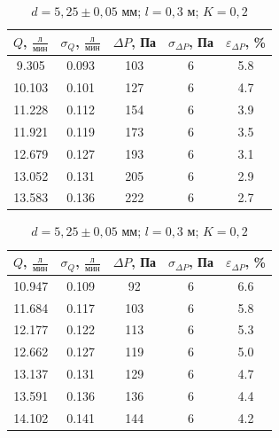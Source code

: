 \documentclass[a4paper,12pt]{article}
\begin{document}
\begin{table}[h!]
\centering
\begin{minipage}{0.48\textwidth}
\centering
    \begin{tabular}{|c|c|c|c|c|}
        \hline
        $Q$, $\frac{\text{л}}{\text{мин}}$ & $\sigma_Q$, $\frac{\text{л}}{\text{мин}}$  & $\Delta P$, Па & $\sigma_{\Delta P}$, Па & $\varepsilon_{\Delta P}$, \% \\
        \hline
        9.305 & 0.093 & 103 & 6 & 5.8 \\ \hline
        10.103 & 0.101 & 127 & 6 & 4.7 \\ \hline
        11.228 & 0.112 & 154 & 6 & 3.9 \\ \hline
        11.921 & 0.119 & 173 & 6 & 3.5 \\ \hline
        12.679 & 0.127 & 193 & 6 & 3.1 \\ \hline
        13.052 & 0.131 & 205 & 6 & 2.9 \\ \hline
        13.583 & 0.136 & 222 & 6 & 2.7 \\ \hline
    \end{tabular}
    \caption{$d=5,25 \pm 0,05$ мм; $l = 0,4$ м; $K = 0,2$}
\end{minipage}
\hfill
\begin{minipage}{0.48\textwidth}
\centering
    \begin{tabular}{|c|c|c|c|c|}
        \hline
        $Q$, $\frac{\text{л}}{\text{мин}}$ & $\sigma_Q$, $\frac{\text{л}}{\text{мин}}$  & $\Delta P$, Па & $\sigma_{\Delta P}$, Па & $\varepsilon_{\Delta P}$, \% \\
        \hline
        10.947 & 0.109 & 92 & 6 & 6.6 \\ \hline
        11.684 & 0.117 & 103 & 6 & 5.8 \\ \hline
        12.177 & 0.122 & 113 & 6 & 5.3 \\ \hline
        12.662 & 0.127 & 119 & 6 & 5.0 \\ \hline
        13.137 & 0.131 & 129 & 6 & 4.7 \\ \hline
        13.591 & 0.136 & 136 & 6 & 4.4 \\ \hline
        14.102 & 0.141 & 144 & 6 & 4.2 \\ \hline
    \end{tabular}
    \caption{$d=5,25 \pm 0,05$ мм; $l = 0,3$ м; $K = 0,2$}
\end{minipage}
\end{table}
\end{document}
